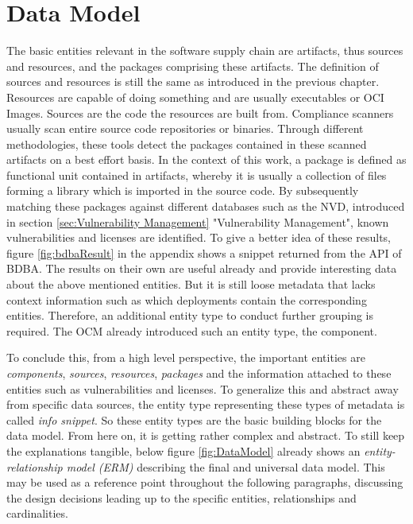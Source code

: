 \section{Data Model} \label{sec:Data Model}
The basic entities relevant in the software supply chain are artifacts, thus sources and resources, and the packages comprising these artifacts. The definition of sources and resources is still the same as introduced in the previous chapter. Resources are capable of doing something and are usually executables or OCI Images. Sources are the code the resources are built from. Compliance scanners usually scan entire source code repositories or binaries. Through different methodologies, these tools detect the packages contained in these scanned artifacts on a best effort basis. In the context of this work, a package is defined as functional unit contained in artifacts, whereby it is usually a collection of files forming a library which is imported in the source code. By subsequently matching these packages against different databases such as the NVD, introduced in section \ref{sec:Vulnerability Management} "Vulnerability Management", known vulnerabilities and licenses are identified. To give a better idea of these results, figure \ref{fig:bdbaResult} in the appendix shows a snippet returned from the API of BDBA. The results on their own are useful already and provide interesting data about the above mentioned entities. But it is still loose metadata that lacks context information such as which deployments contain the corresponding entities. Therefore, an additional entity type to conduct further grouping is required. The OCM already introduced such an entity type, the component.\par
To conclude this, from a high level perspective, the important entities are \emph{components}, \emph{sources}, \emph{resources}, \emph{packages} and the information attached to these entities such as vulnerabilities and licenses. To generalize this and abstract away from specific data sources, the entity type representing these types of metadata is called \emph{info snippet}. So these entity types are the basic building blocks for the data model. From here on, it is getting rather complex and abstract. To still keep the explanations tangible, below figure \ref{fig:DataModel} already shows an \emph{entity-relationship model (ERM)} describing the final and universal data model. This may be used as a reference point throughout the following paragraphs, discussing the design decisions leading up to the specific entities, relationships and cardinalities.

